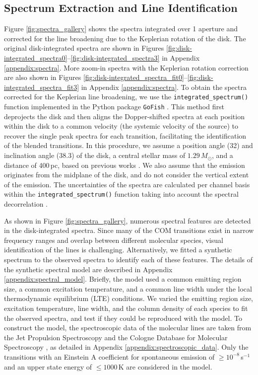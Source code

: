 \documentclass[linenumbers, twocolumn, twocolappendix, astrosymb, times]{aastex631}
\begin{document}
\subsection{Spectrum Extraction and Line Identification}\label{subsec:line_identification}
Figure \ref{fig:spectra_gallery} shows the spectra integrated over 1 aperture and corrected for the line broadening due to the Keplerian rotation of the disk. The original disk-integrated spectra are shown in Figures \ref{fig:disk-integrated_spectra0}--\ref{fig:disk-integrated_spectra3} in Appendix \ref{appendix:spectra}. More zoom-in spectra with the Keplerian rotation correction are also shown in Figures \ref{fig:disk-integrated_spectra_fit0}--\ref{fig:disk-integrated_spectra_fit3} in Appendix \ref{appendix:spectra}. To obtain the spectra corrected for the Keplerian line broadening, we use the \texttt{integrated\_spectrum()} function implemented in the Python package \texttt{GoFish} \citep{GoFish}. This method first deprojects the disk and then aligns the Dopper-shifted spectra at each position within the disk to a common velocity (the systemic velocity of the source) to recover the single peak spectra for each transition, facilitating the identification of the blended transitions. In this procedure, we assume a position angle (32\arcdeg) and inclination angle (38.3\arcdeg) of the disk, a central stellar mass of $1.29\,M_\odot$, and a distance of 400\,pc, based on previous works \citep{Cieza2016, Tobin2023}. We also assume that the emission originates from the midplane of the disk, and do not consider the vertical extent of the emission. The uncertainties of the spectra are calculated per channel basis within the \texttt{integrated\_spectrum()} function taking into account the spectral decorrelation \citep{Yen2016}.

As shown in Figure \ref{fig:spectra_gallery}, numerous spectral features are detected in the disk-integrated spectra. Since many of the COM transitions exist in narrow frequency ranges and overlap between different molecular species, visual identification of the lines is challenging. Alternatively, we fitted a synthetic spectrum to the observed spectra to identify each of these features. The details of the synthetic spectral model are described in Appendix \ref{appendix:spectral_model}. Briefly, the model used a common emitting region size, a common excitation temperature, and a common line width under the local thermodynamic equilibrium (LTE) conditions. We varied the emitting region size, excitation temperature, line width, and the column density of each species to fit the observed spectra, and test if they could be reproduced with the model. To construct the model, the spectroscopic data of the molecular lines are taken from the Jet Propulsion Spectroscopy \citep[JPL;][]{JPL} and the Cologne Database for Molecular Spectroscopy \citep[CDMS;][]{CDMS1, CDMS2, CDMS3}, as detailed in Appendix \ref{appendix:spectroscopic_data}. Only the transitions with an Einstein A coefficient for spontaneous emission of $\geq10^{-8}$\,s$^{-1}$ and an upper state energy of $\leq1000$\,K are considered in the model.
\end{document}
